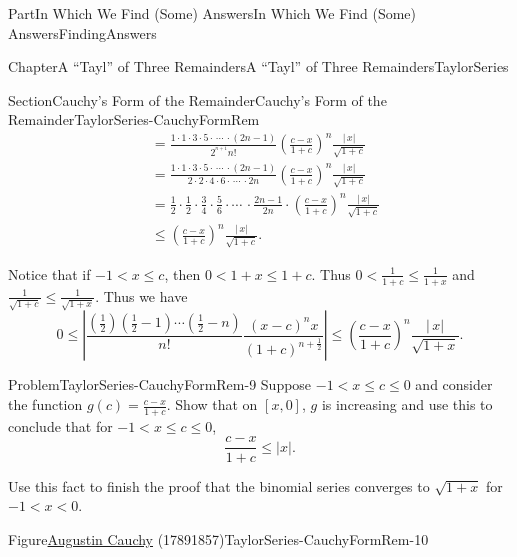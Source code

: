 \documentclass[oneside,10pt,]{book}
\numberwithin{equation}{part}
\newcommand{\lt}{<}
\newcommand{\amp}{&}
\begin{document}
\begin{partptx}{Part}{In Which We Find (Some) Answers}{}{In Which We Find (Some) Answers}{}{}{FindingAnswers}
\begin{chapterptx}{Chapter}{A ``Tayl'' of Three Remainders}{}{A ``Tayl'' of Three Remainders}{}{}{TaylorSeries}
\begin{sectionptx}{Section}{Cauchy's Form of the Remainder}{}{Cauchy's Form of the Remainder}{}{}{TaylorSeries-CauchyFormRem}
\begin{align*}
\amp =\frac{1\cdot 1\cdot 3\cdot 5\cdot\,\cdots\,\cdot\left(2n-1\right)}{2^{^{n+1}}n!}\left(\frac{c-x}{1+c}\right)^n\frac{|\,x|}{\sqrt{1+c}}\\
\amp =\frac{1\cdot 1\cdot 3\cdot 5\cdot\,\cdots\,\cdot\left(2n-1\right)}{2\cdot 2\cdot 4\cdot 6\cdot\,\cdots\,\cdot 2n}\left(\frac{c-x}{1+c}\right)^n\frac{|\,x|}{\sqrt{1+c}}\\
\amp =\frac{1}{2}\cdot\frac{1}{2}\cdot\frac{3}{4}\cdot\frac{5}{6}\cdot\cdots\,\cdot\frac{2n-1}{2n}\cdot\left(\frac{c-x}{1+c}\right)^n\frac{|\,x|}{\sqrt{1+c}}\\
\amp \leq\left(\frac{c-x}{1+c}\right)^n\frac{|\,x|}{\sqrt{1+c}}\text{.}
\end{align*}
%
\par
Notice that if \(-1\lt x\leq c\),\(\) then \(0\lt 1+x\leq 1+c\). Thus \(0\lt \frac{1}{1+c}\leq\frac{1}{1+x}\) and \(\frac{1}{\sqrt{1+c}}\leq\frac{1}{\sqrt{1+x}}\). Thus we have%
\begin{equation*}
0\leq\left|\frac{\left(\frac{1}{2}\right)\left(\frac{1}{2}-1\right)\cdots\left(\frac{1}{2}-n\right)}{n!}\frac{(x-c)^nx}{(1+c)^{n+\frac{1}{2}}}\right|\leq\left(\frac{c-x}{1+c}\right)^n\frac{|\,x|}{\sqrt{1+x}}\text{.}
\end{equation*}
%
\begin{problem}{Problem}{}{TaylorSeries-CauchyFormRem-9}%
 Suppose \(-1\lt x\leq c\leq 0\) and consider the function \(g(c)=\frac{c-x}{1+c}\). Show that on \([x,0]\), \(g\) is increasing and use this to conclude that for \(-1\lt x\leq c\leq 0\),%
\begin{equation*}
\frac{c-x}{1+c}\leq|x|\text{.}
\end{equation*}
%
\par
Use this fact to finish the proof that the binomial series converges to \(\sqrt{1+x}\) for \(-1\lt x\lt 0\).%
\end{problem}
\begin{figureptx}{Figure}{\href{https://mathshistory.st-andrews.ac.uk/Biographies/Cauchy/}{Augustin Cauchy}\protect\footnotemark{} (1789\textendash{}1857)}{TaylorSeries-CauchyFormRem-10}{}%
%
\begin{image}{0.36}{0.28}{0.36}{}%

\end{image}
\end{figureptx}
\end{sectionptx}
\end{chapterptx}
\end{partptx}
\end{document}
